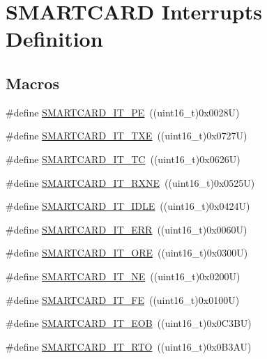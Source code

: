 \hypertarget{group___s_m_a_r_t_c_a_r_d___interrupt__definition}{}\section{S\+M\+A\+R\+T\+C\+A\+RD Interrupts Definition}
\label{group___s_m_a_r_t_c_a_r_d___interrupt__definition}
\subsection*{Macros}
\begin{DoxyCompactItemize}
\item 
\#define \hyperlink{group___s_m_a_r_t_c_a_r_d___interrupt__definition_gac56e07a71ab82a23930ad58e9a8dc806}{S\+M\+A\+R\+T\+C\+A\+R\+D\+\_\+\+I\+T\+\_\+\+PE}~((uint16\+\_\+t)0x0028\+U)
\item 
\#define \hyperlink{group___s_m_a_r_t_c_a_r_d___interrupt__definition_ga758561a96d28254dc3504cb5325dad1f}{S\+M\+A\+R\+T\+C\+A\+R\+D\+\_\+\+I\+T\+\_\+\+T\+XE}~((uint16\+\_\+t)0x0727\+U)
\item 
\#define \hyperlink{group___s_m_a_r_t_c_a_r_d___interrupt__definition_ga808ee7d7c209374af004e8bf1d2ca492}{S\+M\+A\+R\+T\+C\+A\+R\+D\+\_\+\+I\+T\+\_\+\+TC}~((uint16\+\_\+t)0x0626\+U)
\item 
\#define \hyperlink{group___s_m_a_r_t_c_a_r_d___interrupt__definition_ga75b6c6e283a114afa1130f6f1bc98da6}{S\+M\+A\+R\+T\+C\+A\+R\+D\+\_\+\+I\+T\+\_\+\+R\+X\+NE}~((uint16\+\_\+t)0x0525\+U)
\item 
\#define \hyperlink{group___s_m_a_r_t_c_a_r_d___interrupt__definition_ga0b1a5f7e611a976c71168a5b9e3a1f0e}{S\+M\+A\+R\+T\+C\+A\+R\+D\+\_\+\+I\+T\+\_\+\+I\+D\+LE}~((uint16\+\_\+t)0x0424\+U)
\item 
\#define \hyperlink{group___s_m_a_r_t_c_a_r_d___interrupt__definition_ga751761f820948ee230b30a244ca85725}{S\+M\+A\+R\+T\+C\+A\+R\+D\+\_\+\+I\+T\+\_\+\+E\+RR}~((uint16\+\_\+t)0x0060\+U)
\item 
\#define \hyperlink{group___s_m_a_r_t_c_a_r_d___interrupt__definition_gafdbe4b4371bea3dc66f2cc5b9e2353e4}{S\+M\+A\+R\+T\+C\+A\+R\+D\+\_\+\+I\+T\+\_\+\+O\+RE}~((uint16\+\_\+t)0x0300\+U)
\item 
\#define \hyperlink{group___s_m_a_r_t_c_a_r_d___interrupt__definition_ga04cf820da6effba9f284833856ecd105}{S\+M\+A\+R\+T\+C\+A\+R\+D\+\_\+\+I\+T\+\_\+\+NE}~((uint16\+\_\+t)0x0200\+U)
\item 
\#define \hyperlink{group___s_m_a_r_t_c_a_r_d___interrupt__definition_gab6e04d30ea8c0ff7c75e4d6cbe687cfa}{S\+M\+A\+R\+T\+C\+A\+R\+D\+\_\+\+I\+T\+\_\+\+FE}~((uint16\+\_\+t)0x0100\+U)
\item 
\#define \hyperlink{group___s_m_a_r_t_c_a_r_d___interrupt__definition_ga0f1d46faf880c6d17c9156c049206a7c}{S\+M\+A\+R\+T\+C\+A\+R\+D\+\_\+\+I\+T\+\_\+\+E\+OB}~((uint16\+\_\+t)0x0\+C3\+B\+U)
\item 
\#define \hyperlink{group___s_m_a_r_t_c_a_r_d___interrupt__definition_ga9834b14912101cac858fd7b5de574f02}{S\+M\+A\+R\+T\+C\+A\+R\+D\+\_\+\+I\+T\+\_\+\+R\+TO}~((uint16\+\_\+t)0x0\+B3\+A\+U)
\end{DoxyCompactItemize}


